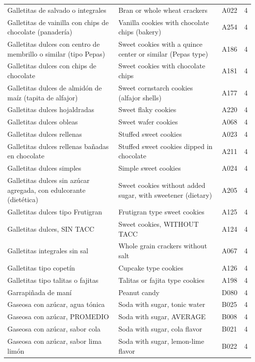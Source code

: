 {\begin{longtable}{p{4.3cm}p{5.5cm}p{1.5cm}p{0.7cm}}
Galletitas de salvado o integrales & Bran or whole wheat crackers & A022 & 4\\
Galletitas de vainilla con chips de chocolate (panadería) & Vanilla cookies with chocolate chips (bakery) & A254 & 4\\
Galletitas dulces con centro de membrillo o similar (tipo Pepas) & Sweet cookies with a quince center or similar (Pepas type) & A186 & 4\\
Galletitas dulces con chips de chocolate & Sweet cookies with chocolate chips & A181 & 4\\
Galletitas dulces de almidón de maíz (tapita de alfajor) & Sweet cornstarch cookies (alfajor shells) & A177 & 4\\
Galletitas dulces hojaldradas & Sweet flaky cookies & A220 & 4\\
Galletitas dulces obleas & Sweet wafer cookies & A068 & 4\\
Galletitas dulces rellenas & Stuffed sweet cookies & A023 & 4\\
Galletitas dulces rellenas bañadas en chocolate & Stuffed sweet cookies dipped in chocolate & A211 & 4\\
Galletitas dulces simples & Simple sweet cookies & A024 & 4\\
Galletitas dulces sin azúcar agregada, con edulcorante (dietética) & Sweet cookies without added sugar, with sweetener (dietary) & A205 & 4\\
Galletitas dulces tipo Frutigran & Frutigran type sweet cookies & A125 & 4\\
Galletitas dulces, SIN TACC & Sweet cookies, WITHOUT TACC & A124 & 4\\
Galletitas integrales sin sal & Whole grain crackers without salt & A067 & 4\\
Galletitas tipo copetín & Cupcake type cookies & A126 & 4\\
Galletitas tipo talitas o fajitas & Talitas or fajita type cookies & A198 & 4\\
Garrapiñada de maní & Peanut candy & D080 & 4\\
Gaseosa con azúcar, agua tónica & Soda with sugar, tonic water & B025 & 4\\
Gaseosa con azúcar, PROMEDIO & Soda with sugar, AVERAGE & B008 & 4\\
Gaseosa con azúcar, sabor cola & Soda with sugar, cola flavor & B021 & 4\\
Gaseosa con azúcar, sabor lima limón & Soda with sugar, lemon-lime flavor & B022 & 4\\

\end{longtable}}
